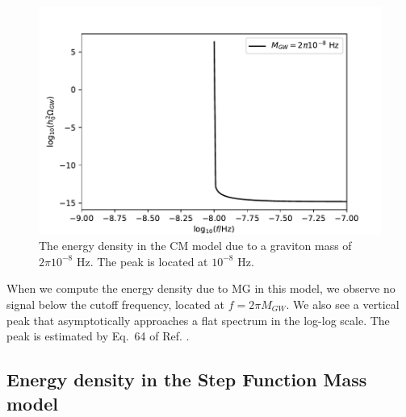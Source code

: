 \documentclass[prd,twocolumn,aps,psfig,nofootinbib,nobibnotes,superscriptaddress,preprintnumbers,times]{revtex4-2}
\begin{document}
\begin{figure}[ht]
\includegraphics[scale=.565]{fig/fig6.pdf}
\caption{The energy density in the CM model due to a graviton mass of $2\pi 10^{-8}$ Hz. The peak is located at $10^{-8}$ Hz.}
\label{fig:CM_omega}
\end{figure}


When we compute the energy density due to MG in this model, we observe no signal below the cutoff frequency, located at $f = 2\pi M_{GW}$. We also see a vertical peak that asymptotically approaches a flat spectrum in the log-log scale. The peak is estimated by Eq.\ 64 of Ref. \cite{Gumrukcuoglu:2012}.

\subsection{Energy density in the Step Function Mass model}
\end{document}
